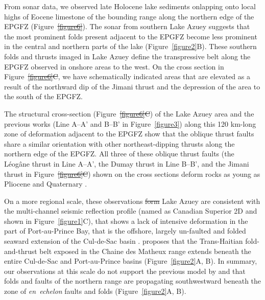 \documentclass[linenumbers,draft]{agujournal}
\providecommand{\DIFaddtex}[1]{{\protect\color{blue}\uwave{#1}}} %
\providecommand{\DIFdeltex}[1]{{\protect\color{red}\sout{#1}}}                      %
\providecommand{\DIFaddbegin}{} %
\providecommand{\DIFaddend}{} %
\providecommand{\DIFdelbegin}{} %
\providecommand{\DIFdelend}{} %
\providecommand{\DIFadd}[1]{\texorpdfstring{\DIFaddtex{#1}}{#1}} %
\providecommand{\DIFdel}[1]{\texorpdfstring{\DIFdeltex{#1}}{}} %
\begin{document}
From sonar data, we observed late Holocene lake sediments onlapping onto local highs of Eocene limestone of the bounding range along the northern edge of the EPGFZ (Figure~\DIFdelbegin \DIFdel{\ref{figure6}}\DIFdelend \DIFaddbegin \DIFadd{\ref{figure5}C, E}\DIFaddend ). The sonar from southern Lake Azuey suggests that the most prominent folds present adjacent to the EPGFZ become less prominent in the central and northern parts of the lake (Figure~\ref{figure2}B). These southern folds and thrusts imaged in Lake Azuey define the transpressive belt along the EPGFZ observed in onshore areas to the west. On the cross section in Figure~\DIFdelbegin \DIFdel{\ref{figure6}C}\DIFdelend \DIFaddbegin \DIFadd{\ref{figure5}E}\DIFaddend , we have schematically indicated areas that are elevated as a result of the northward dip of the Jimani thrust and the depression of the area to the south of the EPGFZ.

The structural cross-section (Figure~\DIFdelbegin \DIFdel{\ref{figure6}C}\DIFdelend \DIFaddbegin \DIFadd{\ref{figure5}E}\DIFaddend ) of the Lake Azuey area and the previous works \citep{massoni1955haiti,bourgueil1988synthese,cox2011shear,douilly2015three} (Line A--A' and B--B' in Figure~\ref{figure3}) along this 120 km-long zone of deformation adjacent to the EPGFZ show that the oblique thrust faults share a similar orientation with other northeast-dipping thrusts along the northern edge of the EPGFZ. All three of these oblique thrust faults (the L\'eog\^ane thrust in Line A--A', the Dumay thrust in Line B--B', and the Jimani thrust in Figure~\DIFdelbegin \DIFdel{\ref{figure6}C}\DIFdelend \DIFaddbegin \DIFadd{\ref{figure5}E}\DIFaddend ) shown on the cross sections deform rocks as young as Pliocene and Quaternary \citep{saint2015seismotectonics}. 

On a more regional scale, these observations \DIFdelbegin \DIFdel{form }\DIFdelend \DIFaddbegin \DIFadd{from }\DIFaddend Lake Azuey are consistent with the multi-channel seismic reflection profile (named as Canadian Superior 2D and shown in Figure~\ref{figure1}C), that shows a lack of intensive deformation in the part of Port-au-Prince Bay, that is the offshore, largely un-faulted and folded seaward extension of the Cul-de-Sac basin \citep{mchugh2011offshore}. \citet{pubellier2000plate} proposes that the Trans-Haitian fold-and-thrust belt exposed in the Chaine des Matheux range extends beneath the entire Cul-de-Sac and Port-au-Prince basins (Figure~\ref{figure2}A, B). In summary, our observations at this scale do not support the previous model by \citet{pubellier2000plate} and \citet{calais2010transpressional} that folds and faults of the northern range are propagating southwestward beneath the zone of \textit{en~echelon} faults and folds (Figure~\ref{figure2}A, B).
\end{document}

